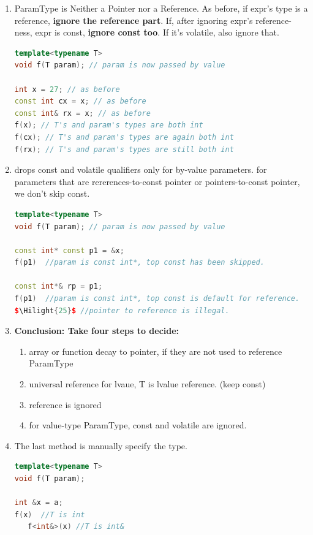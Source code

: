 \documentclass[a4paper,11pt,twoside]{book}
\newcommand{\Hilight}[1]{\makebox[0pt][l]{\color{yellow}\rule[-3pt]{#1em}{11pt}}}
\newcommand{\Hilight}[1]{}
\begin{document}
\begin{enumerate}
	\item ParamType is Neither a Pointer nor a Reference. As before, if expr's type is a reference, \textbf{ignore the reference part}. If, after ignoring expr's reference-ness, expr is const, \textbf{ignore const too}. If it's volatile, also ignore that.
\begin{lstlisting}[frame=single, language=c++]
template<typename T>
void f(T param); // param is now passed by value
	
int x = 27; // as before
const int cx = x; // as before
const int& rx = x; // as before
f(x); // T's and param's types are both int
f(cx); // T's and param's types are again both int
f(rx); // T's and param's types are still both int
\end{lstlisting}
	
	\item  drops const and volatile qualifiers only for by-value parameters. for parameters that are rererences-to-const pointer or pointers-to-const pointer, we don't skip const.
	
\begin{lstlisting}[frame=single, language=c++]
template<typename T>
void f(T param); // param is now passed by value
	
const int* const p1 = &x;
f(p1)  //param is const int*, top const has been skipped. 
	
const int*& rp = p1;
f(p1)  //param is const int*, top const is default for reference. 
$\Hilight{25}$ //pointer to reference is illegal. 
\end{lstlisting}
	
	\item \textbf{Conclusion:  Take four steps to decide:}
	\begin{enumerate}
		\item array or function decay to pointer, if they are not used to reference ParamType
		\item universal reference for lvaue, T is lvalue reference. (keep const)
		\item reference is ignored
		\item for value-type ParamType, const and volatile are ignored.
	\end{enumerate}
	
	\item The last method is manually specify the type.  
\begin{lstlisting}[frame=single, language=c++]
template<typename T>
void f(T param); 
	
int &x = a;
f(x)  //T is int
   f<int&>(x) //T is int&
\end{lstlisting}
	
\end{enumerate}
\end{document}
